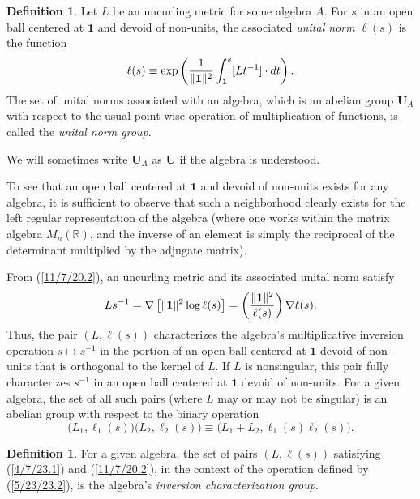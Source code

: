 \documentclass{amsart}
\numberwithin{equation}{section}
\theoremstyle{definition}
\newtheorem{definition}[theorem]{Definition}
\numberwithin{theorem}{section}
\begin{document}
  
  \begin{definition}\label{9/21/23.2} Let $L$ be an uncurling metric for some algebra $A$.  For $s$ in an open ball centered at $\mathbf{1}$ and devoid of non-units, the associated {\it unital norm} $ \ell(s)$ is the function 
  \begin{equation}\label{11/7/20.2}   \ell(s) \equiv \exp\left({\frac{1}{\|{\bf 1}\|^2}\int_{\bf 1}^s [Lt^{-1}]\cdot dt}\right).\end{equation} 
   The set of unital norms associated with an algebra, which is an abelian group $\mathbf{U}_A$ with respect to the usual point-wise operation of multiplication of functions, is called the {\it unital norm group}. \end{definition} 
   
   We will sometimes write $\mathbf{U}_A$ as $\mathbf{U}$ if the algebra is understood.
   
To see that an open ball centered at $\mathbf{1}$ and devoid of non-units exists for any algebra, it is sufficient to observe that such a neighborhood clearly exists for the left regular representation of the algebra (where one works within the matrix algebra $ M_n(\mathbb{R})$, and the inverse of an element is simply the reciprocal of the determinant multiplied by the adjugate matrix).
  
    From (\ref{11/7/20.2}), an uncurling metric and its associated unital norm satisfy  \begin{equation}\label{11/7/20.1} Ls^{-1}  = \nabla\left[\|{\bf 1}\|^2\log  \ell(s)\right] =   \left(\frac{\|{\bf 1}\|^2}{ \ell(s)}\right)\nabla \ell(s).\end{equation} 
Thus, the pair $(L, \ell(s))$ characterizes the algebra's multiplicative inversion operation $s\mapsto s^{-1}$ in the portion of an open ball centered at $\mathbf{1}$ devoid of non-units that is orthogonal to the kernel of $L$.  If $L$ is nonsingular, this pair fully characterizes $s^{-1}$ in an open ball centered at $\mathbf{1}$ devoid of non-units.  For a given algebra, the set of all such pairs (where $L$ may or may not be singular) is an abelian group with respect to the binary operation 
\begin{equation}\label{5/23/23.2} \big(L_1, \ell_1(s)\big)\big(L_2, \ell_2(s)\big) \equiv 
\big(L_1+L_2, \ell_1(s)  \ell_2(s)\big).\end{equation} 
\begin{definition} For a given algebra, the set of pairs $(L, \ell(s))$ satisfying (\ref{4/7/23.1}) and (\ref{11/7/20.2}), in the context of the operation defined by (\ref{5/23/23.2}), is the algebra's {\it inversion characterization group}. \end{definition}
\end{document}
